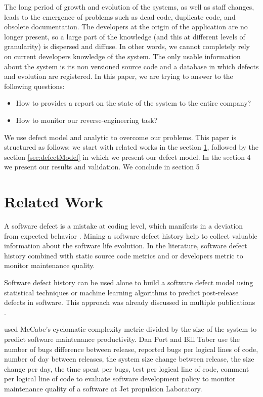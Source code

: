 \documentclass[10pt,conference]{IEEEtran}
\begin{document}
The long period of growth and evolution of the systems, as well as staff changes, leads to the emergence of problems such as dead code, duplicate code, and obsolete documentation. 
The developers at the origin of the application are no longer present, so a large part of the knowledge (and this at different levels of granularity) is dispersed and diffuse. 
In other words, we cannot completely rely on current developers knowledge of the system.
The only usable information about the system is  its non versioned source code and a database in which defects and evolution are registered.
 In this paper, we are trying to answer to the following questions:
\begin{itemize}
\item How to provides a report on the state of the system to the entire company?
\item How to monitor our reverse-engineering task?
\end{itemize}
We use defect model and analytic to overcome our problems.
 This paper is structured as follows: we start with related works in the section \ref{sec:related-work}, followed by  the section \ref{sec:defectModel}  in which we present our defect model. 
 In the section 4 we present our results and validation. We  conclude in section 5 
 
\section{Related Work}\label{sec:related-work}
A software defect is a mistake at coding level, which manifests in a deviation from expected behavior . Mining a software defect history help to collect valuable information about the software life evolution. 
In the literature, software defect history combined with static source code metrics and or developers metric to monitor maintenance quality.

Software defect history can be used alone to build a software defect model using statistical techniques or machine learning algorithms to predict post-release defects in software. This approach was already discussed in multiple  publications \cite{Catal09, Hall12, Hoss17, Li19a, malh15,bibi06, Tanti16}.

\cite{gill91} used McCabe’s cyclomatic complexity metric divided by the size of the system to predict software maintenance productivity.
Dan Port and Bill Taber \cite{port18} use the number of  bugs difference between release, reported bugs per logical lines of code, number of day between releases, the system size change between release, the size change per day, the time spent  per bugs, test per logical line of code, comment per logical line of code to evaluate software development policy  to monitor maintenance quality of a software at Jet propulsion Laboratory.
\end{document}
